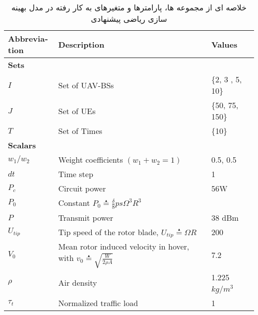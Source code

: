 \begin{table*}%
\caption{خلاصه ای از مجموعه ها، پارامترها و متغیرهای به کار رفته در مدل بهینه سازی ریاضی پیشنهادی}
\begin{adjustbox}{width=\columnwidth,center}
	\begin{latin}
\begin{tabular}{|lll|}
\hline
\multicolumn{1}{|l|}{\textbf{Abbreviation}} & \multicolumn{1}{l|}{\textbf{Description}} & \textbf{Values} \\ \hline
\multicolumn{3}{|l|}{\textbf{Sets}}                                                                       \\ \hline
\multicolumn{1}{|l|}{$I$}                     & \multicolumn{1}{l|}{Set of UAV-BSs}          & \{2, 3 , 5, 10\}    \\ 
\multicolumn{1}{|l|}{$J$}                     & \multicolumn{1}{l|}{Set of UEs}         & \{50, 75, 150\}   \\ 
\multicolumn{1}{|l|}{$T$}                     & \multicolumn{1}{l|}{Set of  Times}        & \{10\} \\ \hline
\multicolumn{3}{|l|}{\textbf{Scalars}}                                                                    \\  \hline
\multicolumn{1}{|l|}{$w_{1}/w_{2}$}                      & \multicolumn{1}{l|}{Weight coefficients $(w_{1}+w_{2}=1)$}                     &             {0.5, 0.5}    \\ 
\multicolumn{1}{|l|}{$dt$}                      & \multicolumn{1}{l|}{Time step}                     &     1\            \\ 
\multicolumn{1}{|l|}{$P_{c}$}                      & \multicolumn{1}{l|}{Circuit power	}                     &  56W   \            \\ 

\multicolumn{1}{|l|}{$P_{0}$}                      & 
\multicolumn{1}{l|}{Constant $P_{0}\overset{\underset{\mathrm{\blacktriangle}}{}}{=}\frac{\delta}{8}ps\Omega _{}^{3}R_{}^{3}$}                     &                 \\ 
\multicolumn{1}{|l|}{$P$}                      & \multicolumn{1}{l|}{Transmit power	}                     & 38 dBm\            \\ 
\multicolumn{1}{|l|}{$U_{tip}$}                      & \multicolumn{1}{l|}{Tip speed of the rotor blade, $U_{tip}\overset{\underset{\mathrm{\blacktriangle}}{}}{=}\Omega R$}                     &      200\           \\ 
\multicolumn{1}{|l|}{$V_{0}$}                      & \multicolumn{1}{l|}{Mean rotor induced velocity in hover, with $v_{0}\overset{\underset{\mathrm{\blacktriangle}}{}}{=}\sqrt{\frac{W}{2\rho A}}$}                     &         7.2\        \\ 
\multicolumn{1}{|l|}{$\rho$}                      & \multicolumn{1}{l|}{Air density}                     &       1.225 $kg/m^{3}$\          \\ 
\multicolumn{1}{|l|}{ $\tau _{t}$}                      & \multicolumn{1}{l|}{Normalized traffic load}                     &    1\            \\ 



\end{tabular}
\end{latin}
\end{adjustbox}
\end{table*}
